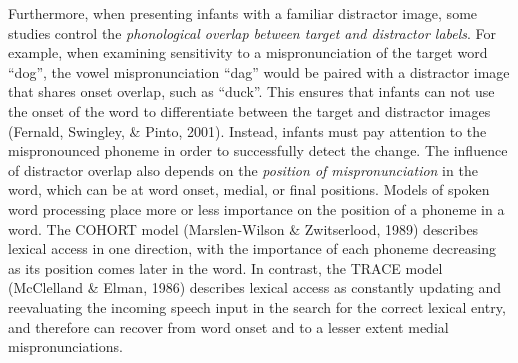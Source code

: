 \documentclass[man]{apa6}
\theoremstyle{definition}
\theoremstyle{definition}
\theoremstyle{definition}
\theoremstyle{remark}
\begin{document}
Furthermore, when presenting infants with a familiar distractor image,
some studies control the \emph{phonological overlap between target and
distractor labels}. For example, when examining sensitivity to a
mispronunciation of the target word \enquote{dog}, the vowel
mispronunciation \enquote{dag} would be paired with a distractor image
that shares onset overlap, such as \enquote{duck}. This ensures that
infants can not use the onset of the word to differentiate between the
target and distractor images (Fernald, Swingley, \& Pinto, 2001).
Instead, infants must pay attention to the mispronounced phoneme in
order to successfully detect the change. The influence of distractor
overlap also depends on the \emph{position of mispronunciation} in the
word, which can be at word onset, medial, or final positions. Models of
spoken word processing place more or less importance on the position of
a phoneme in a word. The COHORT model (Marslen-Wilson \& Zwitserlood,
1989) describes lexical access in one direction, with the importance of
each phoneme decreasing as its position comes later in the word. In
contrast, the TRACE model (McClelland \& Elman, 1986) describes lexical
access as constantly updating and reevaluating the incoming speech input
in the search for the correct lexical entry, and therefore can recover
from word onset and to a lesser extent medial mispronunciations.
\end{document}
